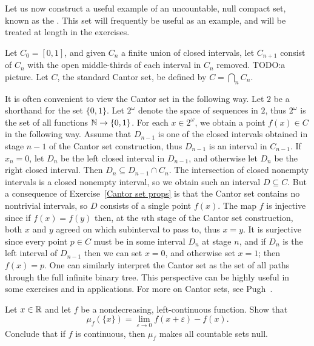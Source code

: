 \begin{subsec}
Let us now construct a useful example of an uncountable, null compact set, known as the .
This set will frequently be useful as an example, and will be treated at length in the exercises.

Let $C_0 = [0, 1]$, and given $C_{n}$ a finite union of closed intervals, let $C_{n+1}$ consist of $C_{n}$ with the open middle-thirds of each interval in $C_{n}$ removed. TODO:\@Draw a picture.
Let $C$, the standard Cantor set, be defined by $C = \bigcap_{n} C_{n}$.
\end{subsec}

\begin{subsec}
It is often convenient to view the Cantor set in the following way. Let $2$ be a shorthand for the set $\{0, 1\}$.
Let $2^\omega$ denote the space of sequences in $2$, thus $2^\omega$ is the set of all functions $\mathbb{N} \to \{0, 1\}$.
For each $x \in 2^\omega$, we obtain a point $f(x) \in C$ in the following way.
Assume that $D_{n-1}$ is one of the closed intervals obtained in stage $n-1$ of the Cantor set construction, thus $D_{n-1}$ is an interval in $C_{n-1}$.
If $x_{n} = 0$, let $D_{n}$ be the left closed interval in $D_{n-1}$, and otherwise let $D_{n}$ be the right closed interval.
Then $D_{n} \subseteq D_{n-1} \cap C_{n}$.
The intersection of closed nonempty intervals is a closed nonempty interval, so we obtain such an interval $D \subseteq C$.
But a consequence of Exercise~\ref{Cantor set props} is that the Cantor set contains no nontrivial intervals, so $D$ consists of a single point $f(x)$.
The map $f$ is injective since if $f(x) = f(y)$ then, at the $n$th stage of the Cantor set construction, both $x$ and $y$ agreed on which subinterval to pass to, thus $x = y$.
It is surjective since every point $p \in C$ must be in some interval $D_{n}$ at stage $n$, and if $D_{n}$ is the left interval of $D_{n-1}$ then we can set $x = 0$, and otherwise set $x = 1$; then $f(x) = p$.
One can similarly interpret the Cantor set as the set of all paths through the full infinite binary tree.
This perspective can be highly useful in some exercises and in applications.
For more on Cantor sets, see Pugh~\cite[Chapter 2]{pugh2013real}.
\end{subsec}

\begin{exercise}
Let $x \in \mathbb{R}$ and let $f$ be a nondecreasing, left-continuous function. Show that
\[\mu_f(\{x\}) = \lim_{\varepsilon \to 0} f(x+\varepsilon) - f(x).\]
Conclude that if $f$ is continuous, then $\mu_f$ makes all countable sets null.
\end{exercise}

